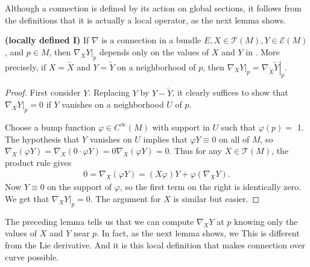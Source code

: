 \documentclass[12pt]{article} %
\newcommand{\bfs}[1]{\textbf{({#1}) }}
\begin{document}
Although a connection is defined by its action on global sections, it follows from the definitions that it is actually a local operator, as the next lemma shows.
\begin{lema}\bfs{locally defined I}\label{lem:ondfad}
If $\nabla$ is a connection in a bundle $E, X \in \mathcal{T}(M), Y \in \mathcal{E}(M)$, and $p \in M$, then $\left.\nabla_{X} Y\right|_{p}$ depends only on the values of $X$ and $Y$ in . More precisely, if $X=\widetilde{X}$ and $Y=\widetilde{Y}$ on a neighborhood of $p$, then $\left.\nabla_{X} Y\right|_{p}=\left.\nabla_{\tilde{X}} \widetilde{Y}\right|_{p}$.
\end{lema}
\begin{proof}
First consider $Y$. Replacing $Y$ by $Y-\tilde{Y}$, it clearly suffices to show that $\left.\nabla_{X} Y\right|_{p}=0$ if $Y$ vanishes on a neighborhood $U$ of $p$.

Choose a bump function $\varphi \in C^{\infty}(M)$ with support in $U$ such that $\varphi(p)=$ 1. The hypothesis that $Y$ vanishes on $U$ implies that $\varphi Y \equiv 0$ on all of $M$, so $\nabla_{X}(\varphi Y)=\nabla_{X}(0 \cdot \varphi Y)=0 \nabla_{X}(\varphi Y)=0$. Thus for any $X \in \mathcal{T}(M)$, the product rule gives
\begin{align*}
0=\nabla_{X}(\varphi Y)=(X \varphi) Y+\varphi\left(\nabla_{X} Y\right) .
\end{align*}
Now $Y \equiv 0$ on the support of $\varphi$, so the first term on the right is identically zero. We get that $\left.\nabla_{X} Y\right|_{p}=0$. The argument for $X$ is similar but easier.
\end{proof}
\begin{rema}
 The preceding lemma tells us that we can compute $\nabla_{X} Y$ at $p$ knowing only the values of $X$ and $Y$ near $p$. In fact, as the next lemma shows, we  This is different from the Lie derivative. And it is this local definition that makes connection over curve possible.
\end{rema}
\end{document}
